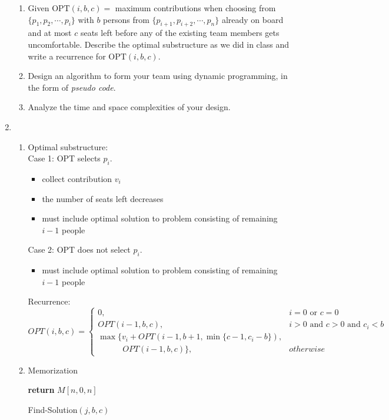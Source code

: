 \documentclass[12pt,a4paper]{article}
\makeatletter
\newtheorem*{solution}{Solution}
\theoremstyle{definition}
\renewenvironment{solution}[1][Solution] {\par\pushQED{\qed}\normalfont\topsep6\p@\@plus6\p@\relax\trivlist\item[\hskip\labelsep\bfseries#1\@addpunct{.}]\ignorespaces}{\popQED\endtrivlist\@endpefalse} \makeatother
\makeatother
\begin{document}
\begin{enumerate}
	\begin{enumerate}
		\item Given $\text{OPT}(i, b, c)=$ maximum contributions when choosing from $\{p_1, p_2, \cdots, p_i\}$ with $b$ persons from $\{p_{i+1}, p_{i+2}, \cdots, p_n\}$ already on board and at most $c$ seats left before any of the existing team members gets uncomfortable. Describe the optimal substructure as we did in class and write a recurrence for $\text{OPT}(i, b, c)$.
		\item Design an algorithm to form your team using dynamic programming, in the form of \emph{pseudo code}.
        \item Analyze the time and space complexities of your design.
	\end{enumerate}
	\begin{solution}
		\hfill
		\begin{enumerate}[label = (\alph*)]
			\item 
			Optimal substructure: \\
			Case 1: OPT selects $p_i$. 
			\begin{itemize}
				\item 
				collect contribution $v_i$
				\item
				the number of seats left decreases
				\item
				must include optimal solution to problem consisting of remaining $i-1$ people
			\end{itemize}
			Case 2: OPT does not select $p_i$.
			\begin{itemize}
				\item 
				must include optimal solution to problem consisting of remaining $i-1$ people
			\end{itemize}
			Recurrence:
			\[
				OPT(i, b, c) = 
				\begin{cases}
					0, & i = 0 \text{ or } c = 0\\
					OPT(i-1, b, c), & i > 0 \text{ and } c > 0 \text{ and } c_i < b \\
					\max \{v_i + OPT(i-1, b+1, \min \{c-1, c_i - b\}), & \\
					\quad \quad \quad OPT(i-1, b, c)\}, & otherwise
				\end{cases}
			\]
			\item
			\begin{minipage}[t]{0.9\textwidth}
				\begin{algorithm}[H]
					\caption{Memorization}
					\textbf{return} $M[n, 0, n]$\;
				\end{algorithm}
				\begin{algorithm}[H]
					\caption{Find-Solution$(j, b, c)$}
					

\end{algorithm}
\end{minipage}
\end{enumerate}
\end{solution}
\end{enumerate}
\end{document}
